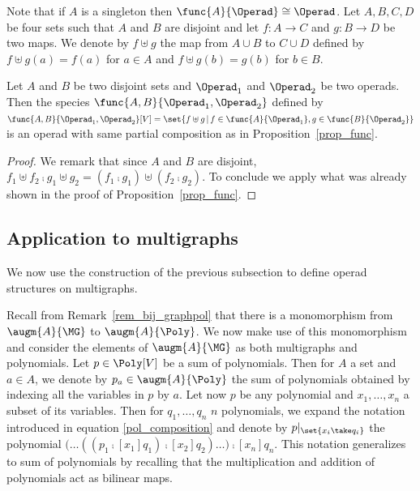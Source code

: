 Note that if $A$ is a singleton then $\func{A}{\Operad} \cong \Operad$. Let $A,B,C,D$ be four sets such 
that $A$ and $B$ are disjoint and let $f:A\to C$ and $g:B\to D$ be two maps. We denote by $f\uplus g$ the map 
from $A\cup B$ to $C\cup D$ defined by $f\uplus g(a) = f(a)$ for $a\in A$ and $f\uplus g(b) = g(b)$ for 
$b\in B$. 

\begin{prop}
    Let $A$ and $B$ be two disjoint sets and $\Operad_1$ and $\Operad_2$ be two operads. Then the species 
    $\func{A,B}{\Operad_1,\Operad_2}$ defined by 
    $\func{A,B}{\Operad_1,\Operad_2}[V] = \set{f\uplus g\,|\, f\in\func{A}{\Operad_1}, g\in\func{B}{\Operad_2}}$ 
    is an operad with same partial composition as in Proposition~\ref{prop_func}.
\end{prop}

\begin{proof}
    We remark that since $A$ and $B$ are disjoint, 
    $f_1\uplus f_2\comp g_1\uplus g_2 = (f_1\comp g_1)\uplus (f_2\comp g_2)$. To conclude we apply what 
    was already shown in the proof of Proposition~\ref{prop_func}.
\end{proof}




\subsection{Application to multigraphs}\label{subsec_graph_op}

We now use the construction of the previous subsection to define operad structures on multigraphs. 

Recall from Remark~\ref{rem_bij_graphpol} that there is a monomorphism from $\augm{A}{\MG}$ to 
$\augm{A}{\Poly}$. We now make use of this monomorphism and consider the elements of $\augm{A}{\MG}$ as 
both multigraphs and polynomials. Let $p\in\Poly[V]$ be a sum of polynomials. Then for $A$ a set and $a\in A$, 
we denote by $p_a\in\augm{A}{\Poly}$ the sum of polynomials obtained by indexing all the variables in $p$ 
by $a$. Let now $p$ be any polynomial and $x_1,\dots, x_n$ a subset of its variables. Then for 
$q_1,\dots, q_n$ $n$ polynomials, we expand the notation introduced in equation \eqref{pol_composition} 
and denote by $p|_{\set{x_i\take q_i}}$ the polynomial 
$\big(\dots((p_1\comp[x_1] q_1)\comp[x_2] q_2)\dots\big)\comp[x_n] q_n$. This notation generalizes to sum 
of polynomials by recalling that the multiplication and addition of polynomials act as bilinear maps.

